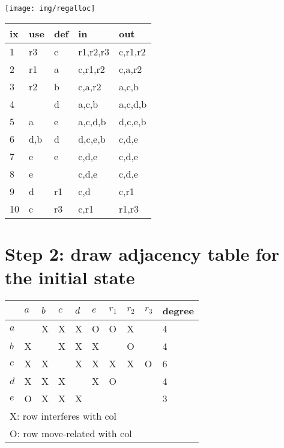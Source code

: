 \begin{minipage}{.5\linewidth}
  \texttt{[image: img/regalloc]}
\end{minipage}
\begin{tabular}{l|p{1cm}p{1cm}p{2cm}p{2cm}}
  \hline
  ix &use & def & in & out \\
  \hline
  1 &r3 &c &r1,r2,r3&c,r1,r2 \\
  2 &r1 &a &c,r1,r2&c,a,r2 \\
  3 &r2 &b &c,a,r2&a,c,b \\
  4 &   &d  &a,c,b&a,c,d,b \\
  5 &a  &e  &a,c,d,b&d,c,e,b \\
  6 &d,b&d  &d,c,e,b&c,d,e \\
  7 &e  &e  &c,d,e&c,d,e \\
  8 &e  &   &c,d,e &c,d,e \\
  9 &d  &r1 &c,d&c,r1 \\
  10 &c &r3 & c,r1 & r1,r3 \\
\hline
\end{tabular}
\section*{Step 2: draw adjacency table for the initial state}
\begin{tabular}{l|lllll|lll|l}
  \hline
  & $a$ & $b$ & $c$ & $d$ & $e$ & $r_1$ & $r_2$ & $r_3$ & degree\\
  \hline
  $a$ &   & X & X & X & O & O  & X &   & 4 \\
  $b$ & X &   & X & X & X &   & O &   & 4\\
  $c$ & X & X &   & X & X & X & X & O & 6\\
  $d$ & X & X & X &   & X & O  &   &   & 4\\
  $e$ & O & X & X & X &  &  &  &      & 3\\
    \hline
    \multicolumn{9}{l}{X: row interferes with col}\\
    \hline
    \multicolumn{9}{l}{O: row move-related with col}\\
  \hline
\end{tabular}

